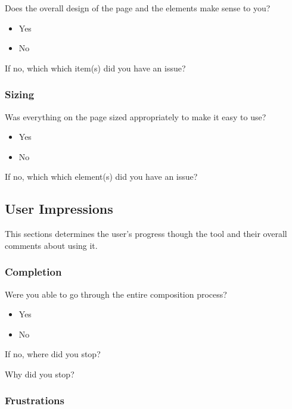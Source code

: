 Does the overall design of the page and the elements make sense to you?

\begin{itemize}
	\item Yes
	\item No
\end{itemize}

\noindent If no, which which item(s) did you have an issue?

\subsubsection{Sizing}
\label{subsubsec:Sizing}

Was everything on the page sized appropriately to make it easy to use?

\begin{itemize}
	\item Yes
	\item No
\end{itemize}

\noindent If no, which which element(s) did you have an issue?

\subsection{User Impressions}
\label{subsec:userimpressions}

This sections determines the user's progress though the tool and their overall comments about using it.

\subsubsection{Completion}
\label{subsubsec:completion}

Were you able to go through the entire composition process?

\begin{itemize}
	\item Yes
	\item No
\end{itemize}

\noindent If no, where did you stop?

\noindent Why did you stop?

\subsubsection{Frustrations}
\label{subsubsec:Frustrations}

